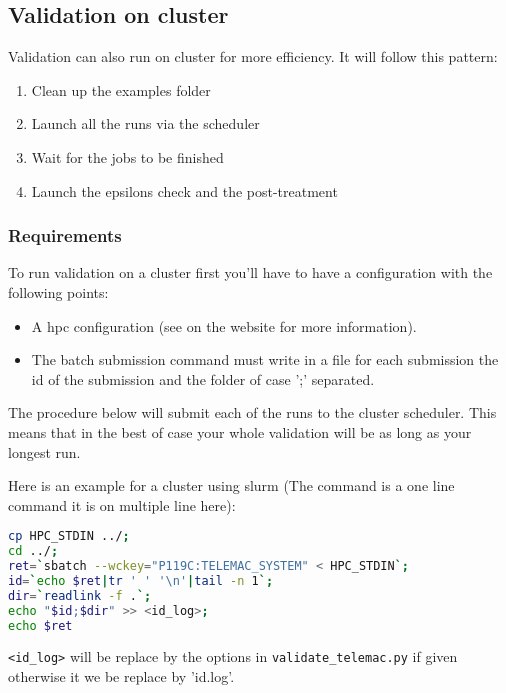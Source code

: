 \subsection{Validation on cluster}

Validation can also run on cluster for more efficiency.
It will follow this pattern:
\begin{enumerate}
  \item Clean up the examples folder
  \item Launch all the \telma runs via the scheduler
  \item Wait for the jobs to be finished
  \item Launch the epsilons check and the post-treatment
\end{enumerate}

\subsubsection{Requirements}

To run validation on a cluster first you'll have to have a configuration with
the following points:
\begin{itemize}
  \item A hpc configuration (see on the website for more information).
  \item The batch submission command must write in a file for each submission
    the id of the submission and the folder of case ';' separated.
\end{itemize}

The procedure below will submit each of the \telma{} runs to the cluster
scheduler. This means that in the best of case your whole validation will be as
long as your longest \telma{} run.

Here is an example for a cluster using slurm (The command is a one line command
it is on multiple line here):
\begin{lstlisting}[language=bash]
cp HPC_STDIN ../;
cd ../;
ret=`sbatch --wckey="P119C:TELEMAC_SYSTEM" < HPC_STDIN`;
id=`echo $ret|tr ' ' '\n'|tail -n 1`;
dir=`readlink -f .`;
echo "$id;$dir" >> <id_log>;
echo $ret
\end{lstlisting}

\verb!<id_log>! will be replace by the options in \verb!validate_telemac.py! if
given otherwise it we be replace by 'id.log'.

